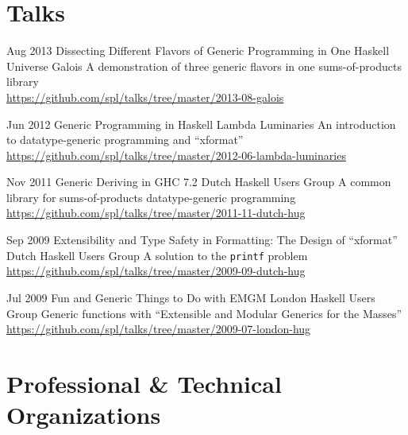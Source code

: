 \documentclass[11pt,a4paper,roman]{moderncv}
\begin{document}


\nocite{*}




\section{Talks}

\cventry%
{Aug 2013}%
{Dissecting Different Flavors of Generic Programming in One Haskell Universe}%
{Galois}%
{\portland}%
{}%
{A demonstration of three generic flavors in one sums-of-products library
\\
\url{https://github.com/spl/talks/tree/master/2013-08-galois}}

\cventry%
{Jun 2012}%
{Generic Programming in Haskell}%
{Lambda Luminaries}%
{\centurion}%
{}%
{An introduction to datatype-generic programming and ``xformat''
\\
\url{https://github.com/spl/talks/tree/master/2012-06-lambda-luminaries}}

\cventry%
{Nov 2011}%
{Generic Deriving in GHC 7.2}%
{Dutch Haskell Users Group}%
{\utrecht}%
{}%
{A common library for sums-of-products datatype-generic programming
\\
\url{https://github.com/spl/talks/tree/master/2011-11-dutch-hug}}

\cventry%
{Sep 2009}%
{Extensibility and Type Safety in Formatting: The Design of ``xformat''}%
{Dutch Haskell Users Group}%
{\utrecht}%
{}%
{A solution to the \texttt{printf} problem
\\
\url{https://github.com/spl/talks/tree/master/2009-09-dutch-hug}}

\cventry%
{Jul 2009}%
{Fun and Generic Things to Do with EMGM}%
{London Haskell Users Group}%
{\london}%
{}%
{Generic functions with ``Extensible and Modular Generics for the Masses''
\\
\url{https://github.com/spl/talks/tree/master/2009-07-london-hug}}


\section{Professional \& Technical Organizations}
\end{document}
